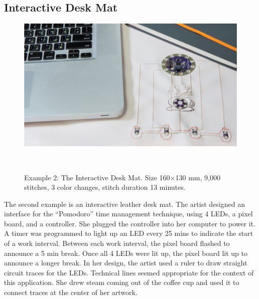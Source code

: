 \documentclass[header.tex]{subfiles}
\begin{document}
\subsection{Interactive Desk Mat}
\begin{figure} [h!]
\centering
  \includegraphics[width=0.9\columnwidth]{figures/DeskMat}
  \caption{Example 2: The Interactive Desk Mat. Size 160$\times$130 mm, 9,000 stitches, 3 color changes, stitch duration 13 minutes.}~\label{fig:DeskMat}
  \vspace{-0.5em}
\end{figure}
The second example is an interactive leather desk mat. The artist designed an interface for the ``Pomodoro'' time management technique, using 4 LEDs, a pixel board, and a controller. She plugged the controller into her computer to power it. A timer was programmed to light up an LED every 25 mins to indicate the start of a work interval. Between each work interval, the pixel board flashed to announce a 5 min break. Once all 4 LEDs were lit up, the pixel board lit up to announce a longer break. In her design, the artist used a ruler to draw straight circuit traces for the LEDs. Technical lines seemed appropriate for the context of this application. She drew steam coming out of the coffee cup and used it to connect traces at the center of her artwork. 
\end{document}
